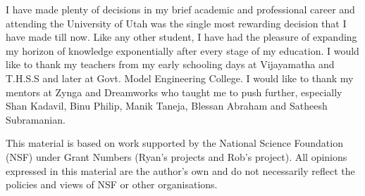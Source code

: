 I have made plenty of decisions in my brief academic and professional career and attending the University of Utah was the single most rewarding decision that I have made till now.
Like any other student, I have had the pleasure of expanding my horizon of knowledge exponentially after every stage of my education.
I would like to thank my teachers from my early schooling days at Vijayamatha and T.H.S.S and later at Govt. Model Engineering College.
I would like to thank my mentors at Zynga and Dreamworks who taught me to push further, especially Shan Kadavil, Binu Philip, Manik Taneja, Blessan Abraham and Satheesh Subramanian.

This material is based on work supported by the National Science Foundation (NSF)  under Grant Numbers (Ryan's projects and Rob's project).
All opinions expressed in this material are the author's own and do not necessarily reflect the policies and views of NSF or other organisations.